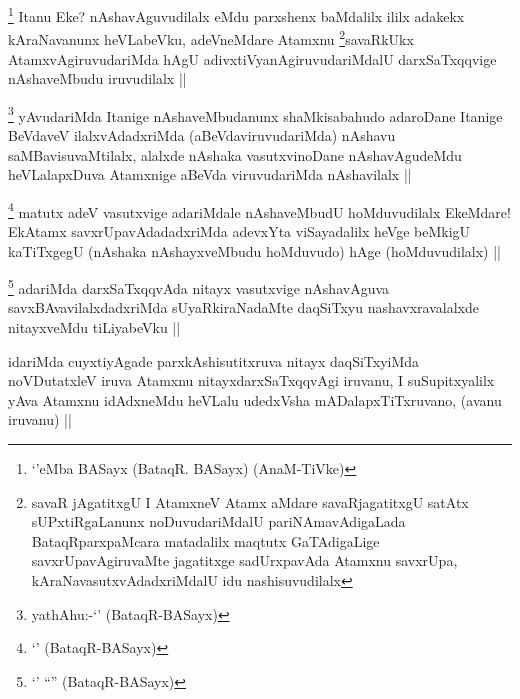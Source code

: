 \begin{artha}
\footnote{`\stext'eMba BASayx (BataqR. BASayx) (AnaM-TiVke)}
Itanu Eke? nAshavAguvudilalx eMdu parxshenx baMdalilx ililx adakekx kAraNavanunx heVLabeVku, adeVneMdare Atamxnu \footnote{savaR jAgatitxgU I AtamxneV Atamx aMdare savaRjagatitxgU satAtx sUPxtiRgaLanunx noDuvudariMdalU pariNAmavAdigaLada BataqRparxpaMcara matadalilx maqtutx GaTAdigaLige savxrUpavAgiruvaMte jagatitxge sadUrxpavAda Atamxnu savxrUpa, kAraNavasutxvAdadxriMdalU idu nashisuvudilalx}savaRkUkx AtamxvAgiruvudariMda hAgU adivxtiVyanAgiruvudariMdalU darxSaTxqqvige nAshaveMbudu iruvudilalx ||
\end{artha}


\begin{artha}
\footnote{yathAhu:-`\stext' (BataqR-BASayx)}
yAvudariMda Itanige nAshaveMbudanunx shaMkisabahudo adaroDane Itanige BeVdaveV ilalxvAdadxriMda (aBeVdaviruvudariMda) nAshavu saMBavisuvaMtilalx, alalxde nAshaka vasutxvinoDane nAshavAgudeMdu heVLalapxDuva Atamxnige aBeVda viruvudariMda nAshavilalx ||
\end{artha}


\begin{artha}
\footnote{`\stext' (BataqR-BASayx)}
matutx adeV vasutxvige adariMdale nAshaveMbudU hoMduvudilalx EkeMdare! EkAtamx savxrUpavAdadadxriMda adevxYta viSayadalilx heVge beMkigU kaTiTxgegU (nAshaka nAshayxveMbudu hoMduvudo) hAge (hoMduvudilalx) ||
\end{artha}


\begin{artha}
\footnote{`\stext' ``\stext'' (BataqR-BASayx)}
adariMda darxSaTxqqvAda nitayx vasutxvige nAshavAguva savxBAvavilalxdadxriMda sUyaRkiraNadaMte daqSiTxyu nashavxravalalxde nitayxveMdu tiLiyabeVku ||
\end{artha}


\begin{artha}
idariMda cuyxtiyAgade parxkAshisutitxruva nitayx daqSiTxyiMda noVDutatxleV iruva Atamxnu nitayxdarxSaTxqqvAgi iruvanu, I suSupitxyalilx yAva Atamxnu idAdxneMdu heVLalu udedxVsha mADalapxTiTxruvano, (avanu iruvanu) ||
\end{artha}

